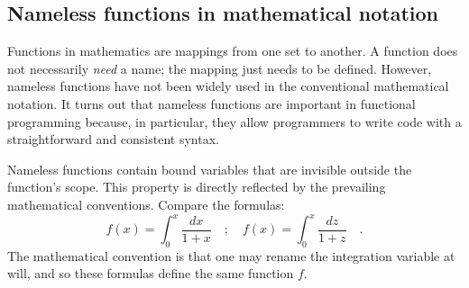 \subsection{Nameless functions in mathematical notation\label{subsec:Nameless-functions-in-mathematical-notation}}

Functions in mathematics are mappings from one set to another. A function
does not necessarily \emph{need} a name; the mapping just needs to
be defined. However, nameless functions have not been widely used
in the conventional mathematical notation. It turns out that nameless
functions are important in functional programming because, in particular,
they allow programmers to write code with a straightforward and consistent
syntax.

Nameless functions contain bound variables that are invisible outside
the function\textsf{'}s scope. This property is directly reflected by the prevailing
mathematical conventions. Compare the formulas:
\[
f\left(x\right)=\int_{0}^{x}\frac{dx}{1+x}\quad;\quad f\left(x\right)=\int_{0}^{x}\frac{dz}{1+z}\quad.
\]
The mathematical convention is that one may rename the integration
variable at will, and so these formulas define the same function $f$.

